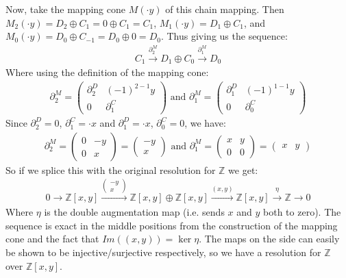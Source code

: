 \documentclass[12pt]{book}
\theoremstyle{definition}
\begin{document}
Now, take the mapping cone $M(\cdot y)$ of this chain mapping. Then $M_2(\cdot y) = D_2 \oplus C_1 = 0 \oplus C_1 = C_1$, $M_1(\cdot y) = D_1 \oplus C_1$, and $M_0 (\cdot y)= D_0 \oplus C_{-1} = D_0 \oplus 0 = D_0$. Thus giving us the sequence: 
\begin{align*}
    C_1 \xrightarrow{\partial_2^M} D_1 \oplus C_0 \xrightarrow{\partial_1^M} D_0
\end{align*}
Where using the definition of the mapping cone: 
\begin{align*}
    \partial^M_2 = 
    \begin{pmatrix}
        \partial^D_2 & (-1)^{2-1}y\\
        0            & \partial_1^C
    \end{pmatrix} \text{ and }
    \partial^M_1 = 
    \begin{pmatrix}
        \partial^D_1 & (-1)^{1-1}y \\
        0            & \partial^C_0
    \end{pmatrix}
\end{align*}
Since $\partial^D_2 = 0$, $\partial^C_1 = \cdot x$ and $\partial^D_1 = \cdot x$, $\partial^C_0 = 0$, we have: 
\begin{align*}
    \partial^M_2 = 
    \begin{pmatrix}
        0 & -y\\
        0 & x
    \end{pmatrix} = 
    \begin{pmatrix}
        -y\\
        x
    \end{pmatrix} \text{ and }
    \partial^M_1 = 
    \begin{pmatrix}
        x & y \\
        0 & 0
    \end{pmatrix} = 
    \begin{pmatrix}
        x & y
    \end{pmatrix}
\end{align*} 
So if we splice this with the original resolution for $\mathbb{Z}$ we get: 
\begin{align*}
    0 \rightarrow \mathbb{Z}[x,y] \xrightarrow{\left(\begin{smallmatrix} -y \\ x \end{smallmatrix}\right)} \mathbb{Z}[x,y] \oplus \mathbb{Z}[x,y] \xrightarrow{(x,y)} \mathbb{Z}[x,y] \xrightarrow{\eta} \mathbb{Z} \rightarrow 0
\end{align*}
Where $\eta$ is the double augmentation map (i.e. sends $x$ and $y$ both to zero). The sequence is exact in the middle positions from the construction of the mapping cone and the fact that $Im((x,y)) = \ker{\eta}$. The maps on the side can easily be shown to be injective/surjective respectively, so we have a resolution for $\mathbb{Z}$ over $\mathbb{Z}[x,y]$. 
\end{document}
